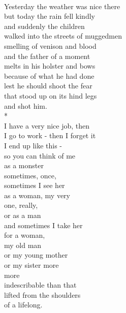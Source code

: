 \documentclass[smalldemyvopaper,11pt,twoside,onecolumn,openright,extrafontsizes]{memoir}
\begin{document}
\\Yesterday the weather was nice there
\\but today the rain fell kindly
\\and suddenly the children
\\walked into the streets of muggedmen
\\smelling of venison and blood
\\and the father of a moment
\\melts in his holster and bows
\\because of what he had done
\\lest he should shoot the fear
\\that stood up on its hind legs
\\and shot him.
\\*
\\I have a very nice job, then
\\I go to work - then I forget it
\\I end up like this -
\\so you can think of me
\\as a monster
\\sometimes, once,
\\sometimes I see her
\\as a woman, my very
\\one, really,
\\or as a man
\\and sometimes I take her
\\for a woman,
\\my old man
\\or my young mother
\\or my sister more
\\more
\\indescribable than that
\\lifted from the shoulders
\\of a lifelong.
\end{document}
